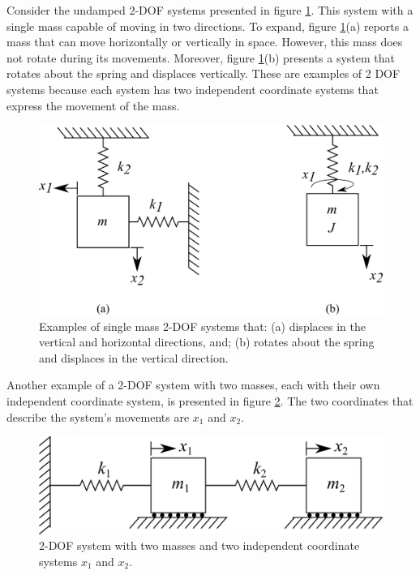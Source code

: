\documentclass[12pt,letter]{article}
\begin{document}
	Consider the undamped 2-DOF systems presented in figure \ref{fig:2-DOF-spring_mass_examples}. This system with a single mass capable of moving in two directions. To expand, figure \ref{fig:2-DOF-spring_mass_examples}(a) reports a mass that can move horizontally or vertically in space. However, this mass does not rotate during its movements. Moreover, figure \ref{fig:2-DOF-spring_mass_examples}(b) presents a system that rotates about the spring and displaces vertically. These are examples of 2 DOF systems because each system has two independent coordinate systems that express the movement of the mass. 
	
	\begin{figure}[H]
		\centering
		\includegraphics[]{../figures/2-DOF-spring_mass_examples.png}
		\caption{Examples of single mass 2-DOF systems that: (a) displaces in the vertical and horizontal directions, and; (b) rotates about the spring and displaces in the vertical direction. }
		\label{fig:2-DOF-spring_mass_examples}
	\end{figure}
	
	Another example of a 2-DOF system with two masses, each with their own independent coordinate system, is presented in figure \ref{fig:2-DOF-spring_mass_horizontal}. The two coordinates that describe the system's movements are $x_1$ and $x_2$.
	
	\begin{figure}[H]
		\centering
		\includegraphics[]{../figures/2-DOF-spring_mass_horizontal.png}
		\caption{2-DOF system with two masses and two independent coordinate systems $x_1$ and $x_2$.}
		\label{fig:2-DOF-spring_mass_horizontal}
	\end{figure}
	
\end{document}
